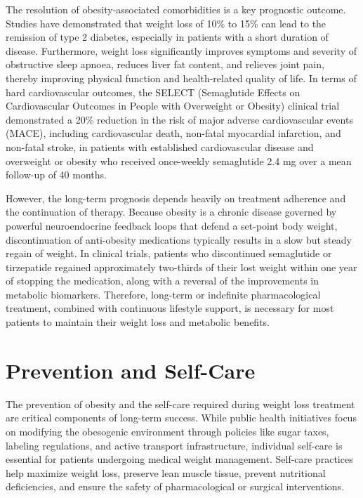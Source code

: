 The resolution of obesity-associated comorbidities is a key prognostic outcome. Studies have demonstrated that weight loss of 10\% to 15\% can lead to the remission of type 2 diabetes, especially in patients with a short duration of disease. Furthermore, weight loss significantly improves symptoms and severity of obstructive sleep apnoea, reduces liver fat content, and relieves joint pain, thereby improving physical function and health-related quality of life. In terms of hard cardiovascular outcomes, the SELECT (Semaglutide Effects on Cardiovascular Outcomes in People with Overweight or Obesity) clinical trial demonstrated a 20\% reduction in the risk of major adverse cardiovascular events (MACE), including cardiovascular death, non-fatal myocardial infarction, and non-fatal stroke, in patients with established cardiovascular disease and overweight or obesity who received once-weekly semaglutide 2.4 mg over a mean follow-up of 40 months.

However, the long-term prognosis depends heavily on treatment adherence and the continuation of therapy. Because obesity is a chronic disease governed by powerful neuroendocrine feedback loops that defend a set-point body weight, discontinuation of anti-obesity medications typically results in a slow but steady regain of weight. In clinical trials, patients who discontinued semaglutide or tirzepatide regained approximately two-thirds of their lost weight within one year of stopping the medication, along with a reversal of the improvements in metabolic biomarkers. Therefore, long-term or indefinite pharmacological treatment, combined with continuous lifestyle support, is necessary for most patients to maintain their weight loss and metabolic benefits.

\section*{Prevention and Self-Care}
The prevention of obesity and the self-care required during weight loss treatment are critical components of long-term success. While public health initiatives focus on modifying the obesogenic environment through policies like sugar taxes, labeling regulations, and active transport infrastructure, individual self-care is essential for patients undergoing medical weight management. Self-care practices help maximize weight loss, preserve lean muscle tissue, prevent nutritional deficiencies, and ensure the safety of pharmacological or surgical interventions.


